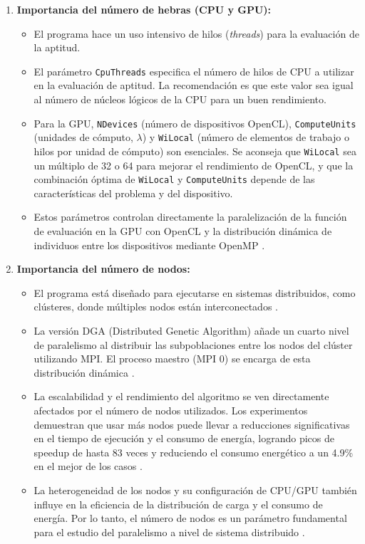 \begin{enumerate}
    \item \textbf{Importancia del número de hebras (CPU y GPU):}
          \begin{itemize}
              \item El programa hace un uso intensivo de hilos (\textit{threads}) para la evaluación de la aptitud.
              \item El parámetro \texttt{CpuThreads} especifica el número de hilos de CPU a utilizar en la evaluación de aptitud. La recomendación es que este valor sea igual al número de núcleos lógicos de la CPU para un buen rendimiento.
              \item Para la GPU, \texttt{NDevices} (número de dispositivos OpenCL), \texttt{ComputeUnits} (unidades de cómputo, $\lambda$) y \texttt{WiLocal} (número de elementos de trabajo o hilos por unidad de cómputo) son esenciales. Se aconseja que \texttt{WiLocal} sea un múltiplo de 32 o 64 para mejorar el rendimiento de OpenCL, y que la combinación óptima de \texttt{WiLocal} y \texttt{ComputeUnits} depende de las características del problema y del dispositivo.
              \item Estos parámetros controlan directamente la paralelización de la función de evaluación en la GPU con OpenCL y la distribución dinámica de individuos entre los dispositivos mediante OpenMP \cite{escobar2020energy}.
          \end{itemize}

    \item \textbf{Importancia del número de nodos:}
          \begin{itemize}
              \item El programa está diseñado para ejecutarse en sistemas distribuidos, como clústeres, donde múltiples nodos están interconectados \cite{escobar2020energy, Escobar2019}.
              \item La versión DGA (Distributed Genetic Algorithm) añade un cuarto nivel de paralelismo al distribuir las subpoblaciones entre los nodos del clúster utilizando MPI. El proceso maestro (MPI 0) se encarga de esta distribución dinámica \cite{escobar2020energy, Escobar2019}.
              \item La escalabilidad y el rendimiento del algoritmo se ven directamente afectados por el número de nodos utilizados. Los experimentos demuestran que usar más nodos puede llevar a reducciones significativas en el tiempo de ejecución y el consumo de energía, logrando picos de speedup de hasta 83 veces y reduciendo el consumo energético a un 4.9\% en el mejor de los casos \cite{escobar2020energy, Escobar2019}.
              \item La heterogeneidad de los nodos y su configuración de CPU/GPU también influye en la eficiencia de la distribución de carga y el consumo de energía. Por lo tanto, el número de nodos es un parámetro fundamental para el estudio del paralelismo a nivel de sistema distribuido \cite{escobar2020energy, Escobar2019}.
          \end{itemize}


\end{enumerate}
